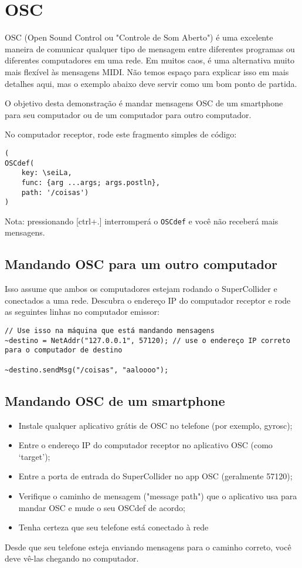 \section{OSC}

OSC (Open Sound Control ou "Controle de Som Aberto") é uma excelente maneira de comunicar qualquer tipo de mensagem entre diferentes programas ou diferentes computadores em uma rede. Em muitos caos, é uma alternativa muito mais flexível às mensagens MIDI. Não temos espaço para explicar isso em mais detalhes aqui, mas o exemplo abaixo deve servir como um bom ponto de partida.

O objetivo desta demonstração é mandar mensagens OSC de um smartphone para seu computador ou de um computador para outro computador.

No computador receptor, rode este fragmento simples de código:

\bigskip
\begin{lstlisting}[style=SuperCollider-IDE, basicstyle=\scttfamily\footnotesize]
(
OSCdef(
	key: \seiLa,
	func: {arg ...args; args.postln},
	path: '/coisas')
)
\end{lstlisting}

Nota: pressionando [ctrl+.] interromperá o \texttt{OSCdef} e você não receberá mais mensagens.

\subsection{Mandando OSC para um outro computador}

Isso assume que ambos os computadores estejam rodando o SuperCollider e conectados a uma rede. Descubra o endereço IP do computador receptor e rode as seguintes linhas no computador emissor:

\begin{lstlisting}[style=SuperCollider-IDE, basicstyle=\scttfamily\footnotesize]
// Use isso na máquina que está mandando mensagens
~destino = NetAddr("127.0.0.1", 57120); // use o endereço IP correto para o computador de destino

~destino.sendMsg("/coisas", "aaloooo");
\end{lstlisting}

\subsection{Mandando OSC de um smartphone}

\begin{itemize}
\item Instale qualquer aplicativo grátis de OSC no telefone (por exemplo, gyrosc);
\item Entre o endereço IP do computador receptor no aplicativo OSC (como ‘target’);
\item Entre a porta de entrada do SuperCollider no app OSC (geralmente 57120);
\item Verifique o caminho de mensagem ("message path") que o aplicativo usa para mandar OSC e mude o seu OSCdef de acordo;
\item Tenha certeza que seu telefone está conectado à rede
\end{itemize}

Desde que seu telefone esteja enviando mensagens para o caminho correto, você deve vê-las chegando no computador.

